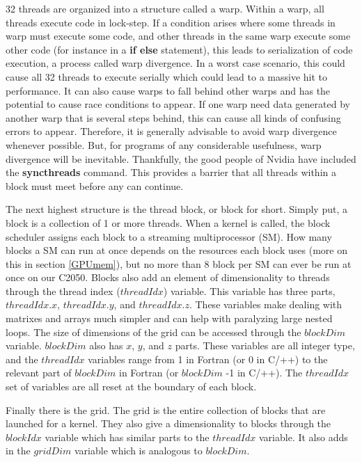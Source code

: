 \documentclass[12pt]{report}
\newcommand{\comm}[1]{\textbf{#1}}
\begin{document}
32 threads are organized into a structure called a warp. Within a warp, all threads execute code in lock-step. If a condition arises where some threads in warp must execute some code, and other threads in the same warp execute some other code (for instance in a \textbf{if else} statement), this leads to serialization of code execution, a process called warp divergence. In a worst case scenario, this could cause all 32 threads to execute serially which could lead to a massive hit to performance. It can also cause warps to fall behind other warps and has the potential to cause race conditions to appear. If one warp need data generated by another warp that is several steps behind, this can cause all kinds of confusing errors to appear. Therefore, it is generally advisable to avoid warp divergence whenever possible. But, for programs of any considerable usefulness, warp divergence will be inevitable. Thankfully, the good people of Nvidia have included the \comm{syncthreads} command. This provides a barrier that all threads within a block must meet before any can continue. 

The next highest structure is the thread block, or block for short. Simply put, a block is a collection of 1 or more threads. When a kernel is called, the block scheduler assigns each block to a streaming multiprocessor (SM). How many blocks a SM can run at once depends on the resources each block uses (more on this in section \ref{GPUmem}), but no more than 8 block per SM can ever be run at once on our C2050. Blocks also add an element of dimensionality to threads through the thread index ($threadIdx$) variable. This variable has three parts, $threadIdx.x$, $threadIdx.y$, and $threadIdx.z$. These variables make dealing with matrixes and arrays much simpler and can help with paralyzing large nested loops. The size of dimensions of the grid can be accessed through the $blockDim$ variable. $blockDim$ also has $x$, $y$, and $z$ parts. These variables are all integer type, and the $threadIdx$ variables range from 1 in Fortran (or 0 in C/++) to the relevant part of $blockDim$ in Fortran (or $blockDim$ -1 in C/++). The $threadIdx$ set of variables are all reset at the boundary of each block. 

Finally there is the grid. The grid is the entire collection of blocks that are launched for a kernel. They also give a dimensionality to blocks through the $blockIdx$ variable which has similar parts to the $threadIdx$ variable. It also adds in the $gridDim$ variable which is analogous to $blockDim$.
\end{document}
